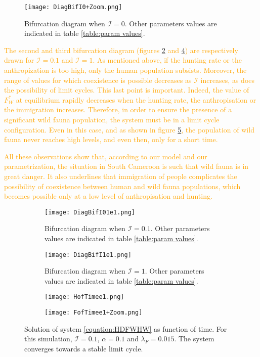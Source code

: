 \documentclass{article}
\newcommand{\lfw}{\lambda_{F}}
\newcommand{\lfw}{\lambda_{F}}
\newcommand{\cI}{\mathcal{I}}
\newcommand{\vdeux}[1]{\textcolor{orange}{#1}}
\theoremstyle{definition}
\theoremstyle{remark}
\begin{document}
\begin{figure}[!ht]
\centering
\texttt{[image: DiagBifI0+Zoom.png]}
\caption{Bifurcation diagram when $\cI = 0$. Other parameters values are indicated in table \ref{table:param values}.}
\label{fig:bifurcation, I=0}
\end{figure}



\vdeux{
The second and third bifurcation diagram (figures \ref{fig:bifurcation, I=0.5} and \ref{fig:bifurcation, I=1}) are respectively drawn for $\cI = 0.1$ and $\cI = 1$. As mentioned above, if the hunting rate or the anthropization is too high, only the human population subsists. Moreover, the range of values for which coexistence is possible decreases as $\cI$ increases, as does the possibility of limit cycles. This last point is important. Indeed, the value of $F_W^*$ at equilibrium rapidly decreases when the hunting rate, the anthropisation or the immigration increases. Therefore, in order to ensure the presence of a significant wild fauna population, the system must be in a limit cycle configuration. Even in this case, and as shown in figure \ref{fig:1d trajectory}, the population of wild fauna never reaches high levels, and even then, only for a short time.
}

\vdeux{All these observations show that, according to our model and our parametrization, the situation in South Cameroon is such that wild fauna is in great danger. It also underlines that immigration of people complicates the possibility of coexistence between human and wild fauna populations, which becomes possible only at a low level of anthropisation and hunting.}

\begin{figure}[!ht]
\centering
\begin{subfigure}{0.49\textwidth}
\texttt{[image: DiagBifI01e1.png]}
\caption{Bifurcation diagram when $\cI = 0.1$. Other parameters values are indicated in table \ref{table:param values}.}
\label{fig:bifurcation, I=0.5}
\end{subfigure}
\begin{subfigure}{0.49\textwidth}
\centering
\texttt{[image: DiagBifI1e1.png]}
\caption{Bifurcation diagram when $\cI = 1$. Other parameters values are indicated in table \ref{table:param values}.}
\label{fig:bifurcation, I=1}
\end{subfigure}
\caption{}
\end{figure}

\begin{figure}[!ht]
\centering
\begin{subfigure}{0.49\textwidth}
\centering
\texttt{[image: HofTimee1.png]}
\end{subfigure}
\begin{subfigure}{0.49\textwidth}
\centering
\texttt{[image: FofTimee1+Zoom.png]}
\end{subfigure}
\caption{Solution of system \eqref{equation:HDFWHW} as function of time. For this simulation, $\cI = 0.1$, $\alpha=0.1$ and $\lfw = 0.015$. The system converges towards a stable limit cycle.}
\label{fig:1d trajectory}
\end{figure}
\end{document}
